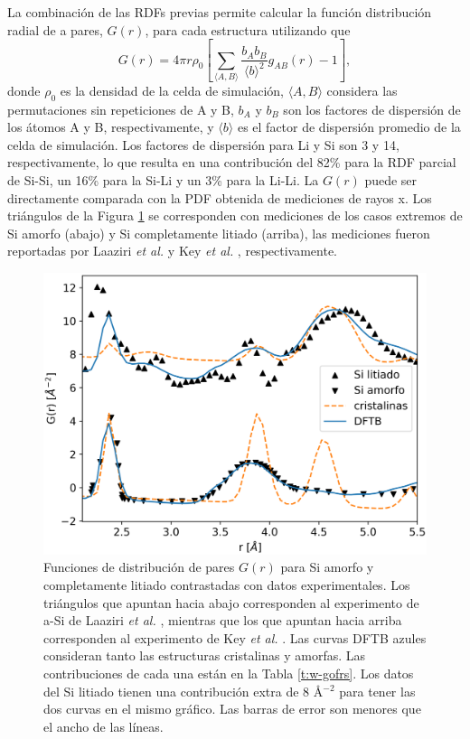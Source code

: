 La combinación de las RDFs previas permite calcular la función distribución radial 
de a pares, $G(r)$, para cada estructura utilizando que \cite{billinge2019}
\begin{equation}
    G(r) = 4 \pi r \rho_0 \left[\sum_{\langle A,B \rangle} \frac{b_A b_B}{\langle b\rangle^2} g_{AB}(r) - 1\right], 
\end{equation}
donde $\rho_0$ es la densidad de la celda de simulación, $\langle A, B \rangle$
considera las permutaciones sin repeticiones de A y B, $b_A$ y $b_B$ son los 
factores de dispersión de los átomos A y B, respectivamente, y $\langle b \rangle$
es el factor de dispersión promedio de la celda de simulación. Los factores de 
dispersión para Li y Si son 3 y 14, respectivamente, lo que resulta en una 
contribución del 82\% para la RDF parcial de Si-Si, un 16\% para la Si-Li y
un 3\% para la Li-Li. La $G(r)$ puede ser directamente comparada con la PDF
obtenida de mediciones de rayos x. Los triángulos de la Figura \ref{fig:pdfs} 
se corresponden con mediciones de los casos extremos de Si amorfo (abajo) y
Si completamente litiado (arriba), las mediciones fueron reportadas por Laaziri 
\textit{et al.} \cite{laaziri1999} y Key \textit{et al.} \cite{key2011}, respectivamente.
\begin{figure}[h!]
    \centering
    \includegraphics[width=.7\textwidth]{Silicio/prediccion/resultados/xray/pdfs.png}
    \caption{Funciones de distribución de pares $G(r)$ para Si amorfo y 
    completamente litiado contrastadas con datos experimentales. Los triángulos 
    que apuntan hacia abajo corresponden al experimento de a-Si de Laaziri 
    \textit{et al.} \cite{laaziri1999}, mientras que los que apuntan hacia arriba 
    corresponden al experimento de Key \textit{et al.} \cite{key2011}. Las curvas 
    DFTB azules consideran tanto las estructuras cristalinas y amorfas. Las 
    contribuciones de cada una están en la Tabla  \ref{t:w-gofrs}. Los datos del Si 
    litiado tienen una contribución extra de 8 \AA$^{-2}$ para tener las dos curvas 
    en el mismo gráfico. Las barras de error son menores que el ancho de las líneas.}
    \label{fig:pdfs}
\end{figure}
